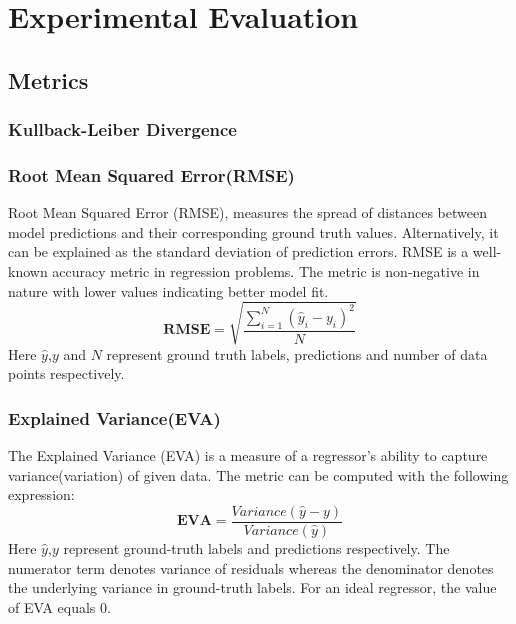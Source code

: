 

    \chapter{Experimental Evaluation}
\section{Metrics}
\subsection{Kullback-Leiber Divergence}\label{sec_kl_div}
\subsection{Root Mean Squared Error(RMSE)}
Root Mean Squared Error (RMSE), measures the spread of distances between model predictions and their corresponding ground truth values. Alternatively, it can be explained as the standard deviation of prediction errors. RMSE is a well-known accuracy metric in regression problems. The metric is non-negative in nature with lower values indicating better model fit.
\begin{equation}
	\mathbf{RMSE} = \sqrt{\frac{\sum_{i=1}^{N}(\hat{y}_i-y_i)^2}{N}}
\end{equation}
Here $\hat{y}$,$y$ and $N$ represent ground truth labels, predictions and number of data points respectively.
\subsection{Explained Variance(EVA)}
The Explained Variance (EVA) is a measure of a regressor's ability to capture variance(variation) of given data. The metric can be computed with the following expression:
\begin{equation}
	\mathbf{EVA} = \frac{Variance(\hat{y}-y)}{Variance(\hat{y})}
\end{equation}
Here $\hat{y}$,$y$ represent ground-truth labels and predictions respectively. The numerator term denotes variance of residuals whereas the denominator denotes the underlying variance in ground-truth labels. For an ideal regressor, the value of EVA equals 0.
